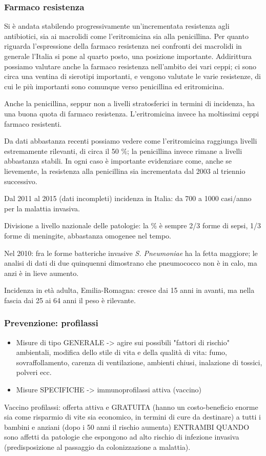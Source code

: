 \subsubsection{Farmaco resistenza}

  Si è andata stabilendo progressivamente un'incrementata resistenza
  agli antibiotici, sia ai macrolidi come l'eritromicina sia alla
  penicillina. Per quanto riguarda l'espressione della farmaco
  resistenza nei confronti dei macrolidi in generale l'Italia si pone al
  quarto posto, una posizione importante. Addirittura possiamo valutare
  anche la farmaco resistenza nell'ambito dei vari ceppi; ci sono circa
  una ventina di sierotipi importanti, e vengono valutate le varie
  resistenze, di cui le più importanti sono comunque verso penicillina
  ed eritromicina.

  Anche la penicillina, seppur non a livelli stratosferici in termini di
  incidenza, ha una buona quota di farmaco resistenza. L'eritromicina
  invece ha moltissimi ceppi farmaco resistenti.

  Da dati abbastanza recenti possiamo vedere come l'eritromicina
  raggiunga livelli estremamente rilevanti, di circa il 50 \%; la
  penicillina invece rimane a livelli abbastanza stabili. In ogni caso è
  importante evidenziare come, anche se lievemente, la resistenza alla
  penicillina sia incrementata dal 2003 al triennio successivo.

  Dal 2011 al 2015 (dati incompleti) incidenza in Italia: da 700 a 1000
  casi/anno per la malattia invasiva.

  Divisione a livello nazionale delle patologie: la \% è sempre 2/3
  forme di sepsi, 1/3 forme di meningite, abbastanza omogenee nel tempo.

  Nel 2010: fra le forme batteriche invasive \emph{S. Pneumoniae} ha la
  fetta maggiore; le analisi di dati di due quinquenni dimostrano che
  pneumococco non è in calo, ma anzi è in lieve aumento.

  Incidenza in età adulta, Emilia-Romagna: cresce dai 15 anni in avanti,
  ma nella fascia dai 25 ai 64 anni il peso è rilevante.

\subsubsection{Prevenzione: profilassi}

\begin{itemize}
\item
  Misure di tipo GENERALE -> agire sui possibili "fattori di rischio"
  ambientali, modifica dello stile di vita e della qualità di vita:
  fumo, sovraffollamento, carenza di ventilazione, ambienti chiusi,
  inalazione di tossici, polveri ecc.
\item
  Misure SPECIFICHE -> immunoprofilassi attiva (vaccino)
\end{itemize}
  Vaccino profilassi: offerta attiva e GRATUITA (hanno un
  costo-beneficio enorme sia come risparmio di vite sia economico, in
  termini di cure da destinare) a tutti i bambini e anziani (dopo i 50
  anni il rischio aumenta) ENTRAMBI QUANDO sono affetti da patologie che
  espongono ad alto rischio di infezione invasiva (predisposizione al
  passaggio da colonizzazione a malattia).

